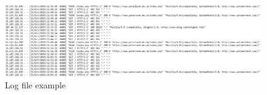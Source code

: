 \begin{figure}[H] 
    \centering
    \includegraphics[width=170mm]{Apdenix/DodgyIPs.PNG}
    \caption{Log file example}
    \label{fig:my_label}
\end{figure}